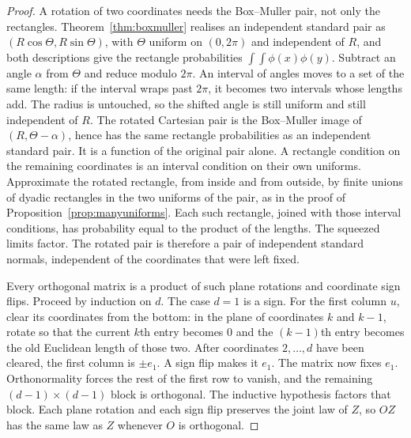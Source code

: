 \begin{proof}
A rotation of two coordinates needs the Box--Muller pair, not only the rectangles. Theorem~\ref{thm:boxmuller} realises an independent standard pair as $(R\cos\Theta,R\sin\Theta)$, with $\Theta$ uniform on $(0,2\pi)$ and independent of $R$, and both descriptions give the rectangle probabilities $\int\!\!\int\phi(x)\phi(y)$. Subtract an angle $\alpha$ from $\Theta$ and reduce modulo $2\pi$. An interval of angles moves to a set of the same length: if the interval wraps past $2\pi$, it becomes two intervals whose lengths add. The radius is untouched, so the shifted angle is still uniform and still independent of $R$. The rotated Cartesian pair is the Box--Muller image of $(R,\Theta-\alpha)$, hence has the same rectangle probabilities as an independent standard pair. It is a function of the original pair alone. A rectangle condition on the remaining coordinates is an interval condition on their own uniforms. Approximate the rotated rectangle, from inside and from outside, by finite unions of dyadic rectangles in the two uniforms of the pair, as in the proof of Proposition~\ref{prop:manyuniforms}. Each such rectangle, joined with those interval conditions, has probability equal to the product of the lengths. The squeezed limits factor. The rotated pair is therefore a pair of independent standard normals, independent of the coordinates that were left fixed.

Every orthogonal matrix is a product of such plane rotations and coordinate sign flips. Proceed by induction on $d$. The case $d=1$ is a sign. For the first column $u$, clear its coordinates from the bottom: in the plane of coordinates $k$ and $k-1$, rotate so that the current $k$th entry becomes $0$ and the $(k-1)$th entry becomes the old Euclidean length of those two. After coordinates $2,\ldots,d$ have been cleared, the first column is $\pm e_1$. A sign flip makes it $e_1$. The matrix now fixes $e_1$. Orthonormality forces the rest of the first row to vanish, and the remaining $(d-1)\times(d-1)$ block is orthogonal. The inductive hypothesis factors that block. Each plane rotation and each sign flip preserves the joint law of $Z$, so $OZ$ has the same law as $Z$ whenever $O$ is orthogonal.


\end{proof}
